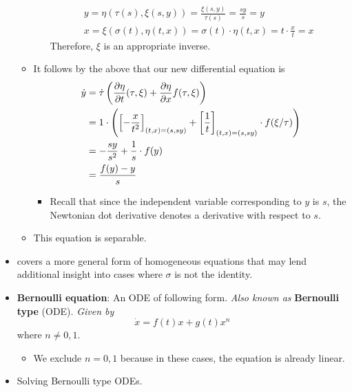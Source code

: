 \documentclass[../notes.tex]{subfiles}
\begin{document}
\begin{itemize}
\begin{itemize}
\begin{itemize}
\begin{gather*}
                y = \eta(\tau(s),\xi(s,y))
                    = \frac{\xi(s,y)}{\tau(s)}
                    = \frac{sy}{s}
                    = y\\
                x = \xi(\sigma(t),\eta(t,x))
                    = \sigma(t)\cdot\eta(t,x)
                    = t\cdot\frac{x}{t}
                    = x
            \end{gather*}
            Therefore, $\xi$ is an appropriate inverse.
        \end{itemize}
        \item It follows by the above that our new differential equation is
        \begin{align*}
            \dot{y} &= \dot{\tau}\left( {\pdv{\eta}{t}}(\tau,\xi)+\pdv{\eta}{x}(\tau,\xi)f(\tau,\xi) \right)\\
            &= 1\cdot\left( \left[ -\frac{x}{t^2} \right]_{(t,x)=(s,sy)}+\left[ \frac{1}{t} \right]_{(t,x)=(s,sy)}\cdot f(\xi/\tau) \right)\\
            &= -\frac{sy}{s^2}+\frac{1}{s}\cdot f(y)\\
            &= \frac{f(y)-y}{s}
        \end{align*}
        \begin{itemize}
            \item Recall that since the independent variable corresponding to $y$ is $s$, the Newtonian dot derivative denotes a derivative with respect to $s$.
        \end{itemize}
        \item This equation is separable.
    \end{itemize}
    \item \textcite{bib:Teschl} covers a more general form of homogeneous equations that may lend additional insight into cases where $\sigma$ is not the identity.
    \item \textbf{Bernoulli equation}: An ODE of following form. \emph{Also known as} \textbf{Bernoulli type} (ODE). \emph{Given by}
    \begin{equation*}
        \dot{x} = f(t)x+g(t)x^n
    \end{equation*}
    where $n\neq 0,1$.
    \begin{itemize}
        \item We exclude $n=0,1$ because in these cases, the equation is already linear.
    \end{itemize}
    \item Solving Bernoulli type ODEs.
    \begin{itemize}

\end{itemize}
\end{itemize}
\end{document}
